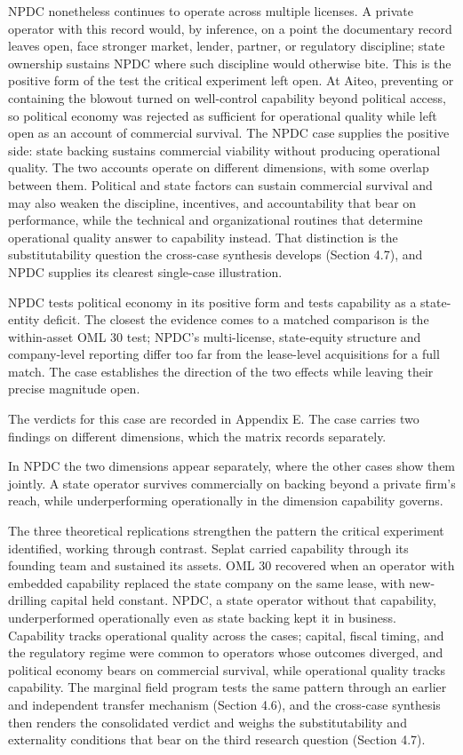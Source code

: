 \documentclass[twoside,fontset=lmodern]{mitthesis}
\begin{document}
NPDC nonetheless continues to operate across multiple licenses. A
private operator with this record would, by inference, on a point the
documentary record leaves open, face stronger market, lender, partner,
or regulatory discipline; state ownership sustains NPDC where such
discipline would otherwise bite. This is the positive form of the test
the critical experiment left open. At Aiteo, preventing or containing
the blowout turned on well-control capability beyond political access,
so political economy was rejected as sufficient for operational quality
while left open as an account of commercial survival. The NPDC case
supplies the positive side: state backing sustains commercial viability
without producing operational quality. The two accounts operate on
different dimensions, with some overlap between them. Political and
state factors can sustain commercial survival and may also weaken the
discipline, incentives, and accountability that bear on performance,
while the technical and organizational routines that determine
operational quality answer to capability instead. That distinction is
the substitutability question the cross-case synthesis develops (Section
4.7), and NPDC supplies its clearest single-case illustration.

NPDC tests political economy in its positive form and tests capability
as a state-entity deficit. The closest the evidence comes to a matched
comparison is the within-asset OML 30 test; NPDC's multi-license,
state-equity structure and company-level reporting differ too far from
the lease-level acquisitions for a full match. The case establishes the
direction of the two effects while leaving their precise magnitude open.

The verdicts for this case are recorded in Appendix E. The case carries
two findings on different dimensions, which the matrix records
separately.

In NPDC the two dimensions appear separately, where the other cases show
them jointly. A state operator survives commercially on backing beyond a
private firm's reach, while underperforming operationally in the
dimension capability governs.

The three theoretical replications strengthen the pattern the critical
experiment identified, working through contrast. Seplat carried
capability through its founding team and sustained its assets. OML 30
recovered when an operator with embedded capability replaced the state
company on the same lease, with new-drilling capital held constant.
NPDC, a state operator without that capability, underperformed
operationally even as state backing kept it in business. Capability
tracks operational quality across the cases; capital, fiscal timing, and
the regulatory regime were common to operators whose outcomes diverged,
and political economy bears on commercial survival, while operational
quality tracks capability. The marginal field program tests the same
pattern through an earlier and independent transfer mechanism (Section
4.6), and the cross-case synthesis then renders the consolidated verdict
and weighs the substitutability and externality conditions that bear on
the third research question (Section 4.7).
\end{document}
